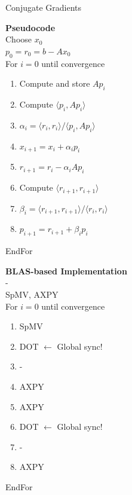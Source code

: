 \begin{frame}[fragile]{Conjugate Gradients}

 \begin{block}{}
  
   \begin{minipage}{0.45\textwidth}
      {\large \textbf{Pseudocode}} \\
      
      Choose $x_0$ \\
      $p_0 = r_0 = b - Ax_0$ \\
      For $i=0$ until convergence
     \begin{enumerate}
      \item Compute and store $Ap_i$
      \item Compute $\langle p_i, Ap_i \rangle$
      \item $\alpha_i = \langle r_i, r_i \rangle / \langle p_i, Ap_i \rangle$
      \item $x_{i+1} = x_{i} + \alpha_i p_i$          
      \item $r_{i+1} = r_i - \alpha_i Ap_i$       
      \item Compute $\langle r_{i+1}, r_{i+1} \rangle$
      \item $\beta_i = \langle r_{i+1}, r_{i+1} \rangle / \langle r_i, r_i \rangle$
      \item $p_{i+1} = r_{i+1} + \beta_i p_i$
     \end{enumerate}
     EndFor
   \end{minipage}
   \begin{minipage}{0.48\textwidth}
      {\large \textbf{BLAS-based Implementation}} \\
      
            - \\
      SpMV, AXPY \\
      For $i=0$ until convergence
     \begin{enumerate}
      \item SpMV
      \item DOT {\color{red} $\leftarrow$ Global sync!}
      \item -
      \item AXPY         
      \item AXPY
      \item DOT {\color{red} $\leftarrow$ Global sync!}
      \item -
      \item AXPY
     \end{enumerate}
     EndFor
   \end{minipage}
   
   \end{block}
   
\end{frame}


